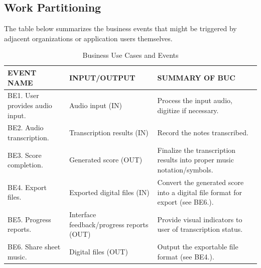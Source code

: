 \documentclass[12pt]{article}
\begin{document}
\subsection{Work Partitioning}
The table below summarizes the business events that might be triggered by adjacent organizations
or application users themselves.\\
\begingroup
\renewcommand{\arraystretch}{1.25}
\begin{table}[h!]
\centering
\begin{tabular}{|>{\raggedright}p{3cm}|>{\raggedright}p{4.25cm}|>{\raggedright\arraybackslash}p{6cm}|}
  \hline
  EVENT NAME & INPUT/OUTPUT & SUMMARY OF BUC \\
  \hline
  BE1. User provides audio input. & Audio input (IN) & Process the input audio, digitize if necessary.\\
  \hline
  BE2. Audio transcription. & Transcription results (IN) & Record the notes transcribed. \\
  \hline
  BE3. Score completion. & Generated score (OUT) & Finalize the transcription results into proper music notation/symbols.\\
  \hline
  BE4. Export files. & Exported digital files (IN)  & Convert the generated score into a digital file format for export (see BE6.).\\
  \hline
  BE5. Progress reports. & Interface feedback/progress reports (OUT) & Provide visual indicators to user of transcription status.\\
  \hline
  BE6. Share sheet music. & Digital files (OUT)  & Output the exportable file format (see BE4.).\\
  \hline
\end{tabular}
\caption{Business Use Cases and Events}
\end{table}
\endgroup
\end{document}
